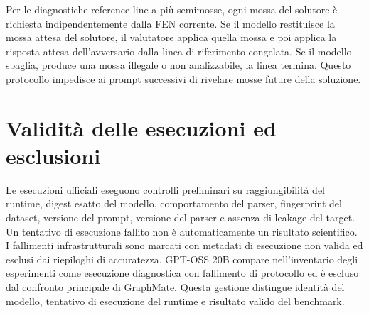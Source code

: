 Per le diagnostiche reference-line a più semimosse, ogni mossa del solutore è richiesta indipendentemente dalla FEN corrente.  Se il modello restituisce la mossa attesa del solutore, il valutatore applica quella mossa e poi applica la risposta attesa dell'avversario dalla linea di riferimento congelata.  Se il modello sbaglia, produce una mossa illegale o non analizzabile, la linea termina.  Questo protocollo impedisce ai prompt successivi di rivelare mosse future della soluzione.

\section{Validità delle esecuzioni ed esclusioni}
\label{app:llm-protocol:validity}

Le esecuzioni ufficiali eseguono controlli preliminari su raggiungibilità del runtime, digest esatto del modello, comportamento del parser, fingerprint del dataset, versione del prompt, versione del parser e assenza di leakage del target.  Un tentativo di esecuzione fallito non è automaticamente un risultato scientifico.  I fallimenti infrastrutturali sono marcati con metadati di esecuzione non valida ed esclusi dai riepiloghi di accuratezza.  GPT-OSS 20B compare nell'inventario degli esperimenti come esecuzione diagnostica con fallimento di protocollo ed è escluso dal confronto principale di GraphMate.  Questa gestione distingue identità del modello, tentativo di esecuzione del runtime e risultato valido del benchmark.
